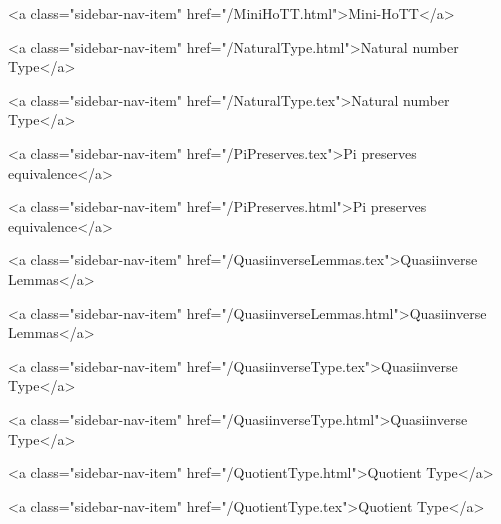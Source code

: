       
        
          <a class="sidebar-nav-item" href="/MiniHoTT.html">Mini-HoTT</a>
        
      
    
      
        
          <a class="sidebar-nav-item" href="/NaturalType.html">Natural number Type</a>
        
      
    
      
        
          <a class="sidebar-nav-item" href="/NaturalType.tex">Natural number Type</a>
        
      
    
      
        
          <a class="sidebar-nav-item" href="/PiPreserves.tex">Pi preserves equivalence</a>
        
      
    
      
        
          <a class="sidebar-nav-item" href="/PiPreserves.html">Pi preserves equivalence</a>
        
      
    
      
        
          <a class="sidebar-nav-item" href="/QuasiinverseLemmas.tex">Quasiinverse Lemmas</a>
        
      
    
      
        
          <a class="sidebar-nav-item" href="/QuasiinverseLemmas.html">Quasiinverse Lemmas</a>
        
      
    
      
        
          <a class="sidebar-nav-item" href="/QuasiinverseType.tex">Quasiinverse Type</a>
        
      
    
      
        
          <a class="sidebar-nav-item" href="/QuasiinverseType.html">Quasiinverse Type</a>
        
      
    
      
        
          <a class="sidebar-nav-item" href="/QuotientType.html">Quotient Type</a>
        
      
    
      
        
          <a class="sidebar-nav-item" href="/QuotientType.tex">Quotient Type</a>
        
